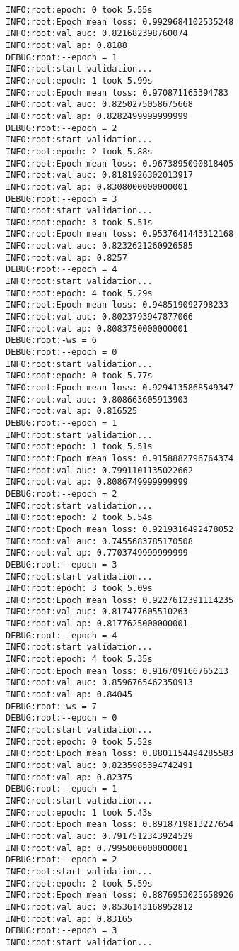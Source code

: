 \documentclass[11pt]{article}
\begin{document}
\begin{verbatim}
INFO:root:epoch: 0 took 5.55s
INFO:root:Epoch mean loss: 0.9929684102535248
INFO:root:val auc: 0.821682398760074
INFO:root:val ap: 0.8188
DEBUG:root:--epoch = 1
INFO:root:start validation...
INFO:root:epoch: 1 took 5.99s
INFO:root:Epoch mean loss: 0.970871165394783
INFO:root:val auc: 0.8250275058675668
INFO:root:val ap: 0.8282499999999999
DEBUG:root:--epoch = 2
INFO:root:start validation...
INFO:root:epoch: 2 took 5.88s
INFO:root:Epoch mean loss: 0.9673895090818405
INFO:root:val auc: 0.8181926302013917
INFO:root:val ap: 0.8308000000000001
DEBUG:root:--epoch = 3
INFO:root:start validation...
INFO:root:epoch: 3 took 5.51s
INFO:root:Epoch mean loss: 0.9537641443312168
INFO:root:val auc: 0.8232621260926585
INFO:root:val ap: 0.8257
DEBUG:root:--epoch = 4
INFO:root:start validation...
INFO:root:epoch: 4 took 5.29s
INFO:root:Epoch mean loss: 0.948519092798233
INFO:root:val auc: 0.8023793947877066
INFO:root:val ap: 0.8083750000000001
DEBUG:root:-ws = 6
DEBUG:root:--epoch = 0
INFO:root:start validation...
INFO:root:epoch: 0 took 5.77s
INFO:root:Epoch mean loss: 0.9294135868549347
INFO:root:val auc: 0.808663605913903
INFO:root:val ap: 0.816525
DEBUG:root:--epoch = 1
INFO:root:start validation...
INFO:root:epoch: 1 took 5.51s
INFO:root:Epoch mean loss: 0.9158882796764374
INFO:root:val auc: 0.7991101135022662
INFO:root:val ap: 0.8086749999999999
DEBUG:root:--epoch = 2
INFO:root:start validation...
INFO:root:epoch: 2 took 5.54s
INFO:root:Epoch mean loss: 0.9219316492478052
INFO:root:val auc: 0.7455683785170508
INFO:root:val ap: 0.7703749999999999
DEBUG:root:--epoch = 3
INFO:root:start validation...
INFO:root:epoch: 3 took 5.09s
INFO:root:Epoch mean loss: 0.9227612391114235
INFO:root:val auc: 0.817477605510263
INFO:root:val ap: 0.8177625000000001
DEBUG:root:--epoch = 4
INFO:root:start validation...
INFO:root:epoch: 4 took 5.35s
INFO:root:Epoch mean loss: 0.916709166765213
INFO:root:val auc: 0.8596765462350913
INFO:root:val ap: 0.84045
DEBUG:root:-ws = 7
DEBUG:root:--epoch = 0
INFO:root:start validation...
INFO:root:epoch: 0 took 5.52s
INFO:root:Epoch mean loss: 0.8801154494285583
INFO:root:val auc: 0.8235985394742491
INFO:root:val ap: 0.82375
DEBUG:root:--epoch = 1
INFO:root:start validation...
INFO:root:epoch: 1 took 5.43s
INFO:root:Epoch mean loss: 0.8918719813227654
INFO:root:val auc: 0.7917512343924529
INFO:root:val ap: 0.7995000000000001
DEBUG:root:--epoch = 2
INFO:root:start validation...
INFO:root:epoch: 2 took 5.59s
INFO:root:Epoch mean loss: 0.8876953025658926
INFO:root:val auc: 0.8536143168952812
INFO:root:val ap: 0.83165
DEBUG:root:--epoch = 3
INFO:root:start validation...

\end{verbatim}
\end{document}
